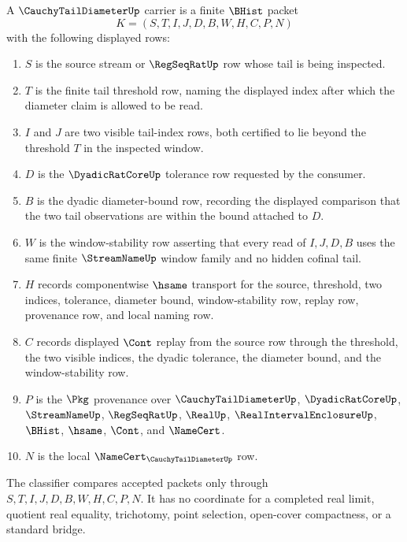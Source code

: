 \begin{definition}
\label{def:cauchy-tail-diameter-carrier}
A $\CauchyTailDiameterUp$ carrier is a finite $\BHist$ packet
$$
K=(S,T,I,J,D,B,W,H,C,P,N)
$$
with the following displayed rows:
\begin{enumerate}
\item $S$ is the source stream or $\RegSeqRatUp$ row whose tail is being inspected.
\item $T$ is the finite tail threshold row, naming the displayed index after which the diameter claim is allowed to be read.
\item $I$ and $J$ are two visible tail-index rows, both certified to lie beyond the threshold $T$ in the inspected window.
\item $D$ is the $\DyadicRatCoreUp$ tolerance row requested by the consumer.
\item $B$ is the dyadic diameter-bound row, recording the displayed comparison that the two tail observations are within the bound attached to $D$.
\item $W$ is the window-stability row asserting that every read of $I,J,D,B$ uses the same finite $\StreamNameUp$ window family and no hidden cofinal tail.
\item $H$ records componentwise $\hsame$ transport for the source, threshold, two indices, tolerance, diameter bound, window-stability row, replay row, provenance row, and local naming row.
\item $C$ records displayed $\Cont$ replay from the source row through the threshold, the two visible indices, the dyadic tolerance, the diameter bound, and the window-stability row.
\item $P$ is the $\Pkg$ provenance over $\CauchyTailDiameterUp$, $\DyadicRatCoreUp$, $\StreamNameUp$, $\RegSeqRatUp$, $\RealUp$, $\RealIntervalEnclosureUp$, $\BHist$, $\hsame$, $\Cont$, and $\NameCert$.
\item $N$ is the local $\NameCert_{\CauchyTailDiameterUp}$ row.
\end{enumerate}
The classifier compares accepted packets only through $S,T,I,J,D,B,W,H,C,P,N$. It has no coordinate for a completed real limit, quotient real equality, trichotomy, point selection, open-cover compactness, or a standard bridge.
\end{definition}

